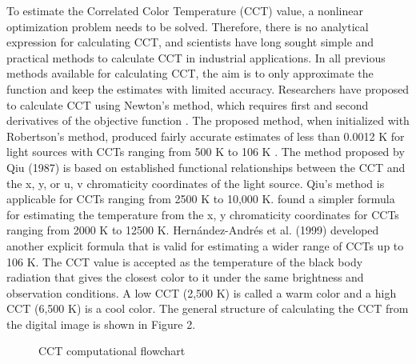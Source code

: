 \documentclass{article}
\begin{document}
To estimate the Correlated Color Temperature (CCT) value, a nonlinear optimization problem needs to be solved. Therefore, there is no analytical expression for calculating CCT, and scientists have long sought simple and practical methods to calculate CCT in industrial applications. In all previous methods available for calculating CCT, the aim is to only approximate the function and keep the estimates with limited accuracy. Researchers have proposed to calculate CCT using Newton's method, which requires first and second derivatives of the objective function \cite{li2016accurate}. The proposed method, when initialized with Robertson's method, produced fairly accurate estimates of less than 0.0012 K for light sources with CCTs ranging from 500 K to 106 K \cite{robertson1968computation}. The method proposed by Qiu (1987) is based on established functional relationships between the CCT and the x, y, or u, v chromaticity coordinates of the light source. Qiu's method is applicable for CCTs ranging from 2500 K to 10,000 K. \cite{mccamy1992correlated} found a simpler formula for estimating the temperature from the x, y chromaticity coordinates for CCTs ranging from 2000 K to 12500 K. Hernández-Andrés et al. (1999) \cite{hernandez1999calculating} developed another explicit formula that is valid for estimating a wider range of CCTs up to 106 K. The CCT value is accepted as the temperature of the black body radiation that gives the closest color to it under the same brightness and observation conditions. A low CCT (2,500 K) is called a warm color and a high CCT (6,500 K) is a cool color. The general structure of calculating the CCT from the digital image is shown in Figure 2.

\begin{figure}[H]
  \caption{CCT computational flowchart}
  \label{fig:cctflowchart}

\end{figure}
\end{document}
